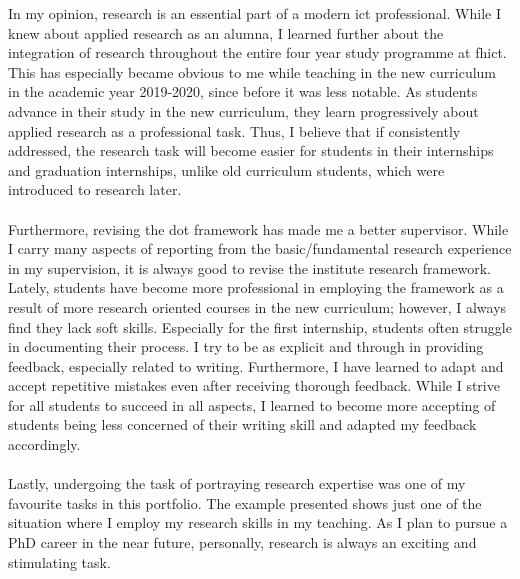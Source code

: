 In my opinion, research is an essential part of a modern \acrshort{ict} professional. 
While I knew about applied research as an alumna, I learned further about the integration of research throughout the entire four year study programme at \acrshort{fhict}. 
This has especially became obvious to me while teaching in the new curriculum in the academic year 2019-2020, since before it was less notable. 
As students advance in their study in the new curriculum, they learn progressively about applied research as a professional task. 
Thus, I believe that if consistently addressed, the research task will become easier for students in their internships and graduation internships, unlike old curriculum students, which were introduced to research later.\\\\
Furthermore, revising the \acrshort{dot} framework has made me a better supervisor. 
While I carry many aspects of reporting from the basic/fundamental research experience in my supervision, it is always good to revise the institute research framework. Lately, students have become more professional in employing the framework as a result of more research oriented courses in the new curriculum; however, I always find they lack soft skills. Especially for the first internship, students often struggle in documenting their process. I try to be as explicit and through in providing feedback, especially related to writing. Furthermore, I have learned to adapt and accept repetitive mistakes even after receiving thorough feedback. While I strive for all students to succeed in all aspects, I learned to become more accepting of students being less concerned of their writing skill and adapted my feedback accordingly. 
\\\\
Lastly, undergoing the task of portraying research expertise was one of my favourite tasks in this portfolio. The example presented shows just one of the situation where I employ my research skills in my teaching. As I plan to pursue a PhD career in the near future, personally, research is always an exciting and stimulating task.
